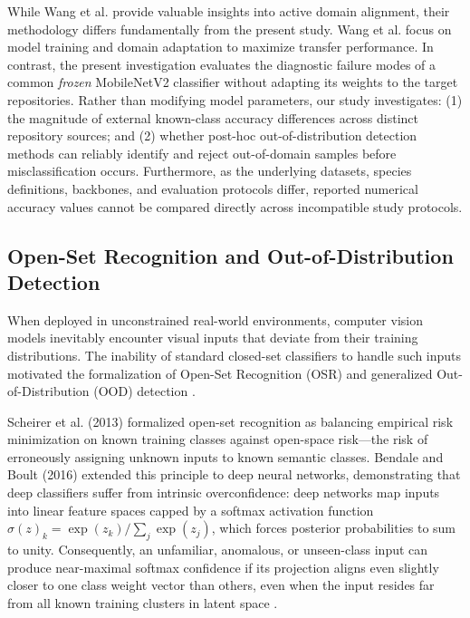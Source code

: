 While Wang et al. \cite{wang2023crossdomain} provide valuable insights into active domain alignment, their methodology differs fundamentally from the present study. Wang et al. focus on model training and domain adaptation to maximize transfer performance. In contrast, the present investigation evaluates the diagnostic failure modes of a common \textit{frozen} MobileNetV2 classifier without adapting its weights to the target repositories. Rather than modifying model parameters, our study investigates: (1) the magnitude of external known-class accuracy differences across distinct repository sources; and (2) whether post-hoc out-of-distribution detection methods can reliably identify and reject out-of-domain samples before misclassification occurs. Furthermore, as the underlying datasets, species definitions, backbones, and evaluation protocols differ, reported numerical accuracy values cannot be compared directly across incompatible study protocols.

\subsection{Open-Set Recognition and Out-of-Distribution Detection}
\label{sec:osr_ood_detection}

When deployed in unconstrained real-world environments, computer vision models inevitably encounter visual inputs that deviate from their training distributions. The inability of standard closed-set classifiers to handle such inputs motivated the formalization of Open-Set Recognition (OSR) and generalized Out-of-Distribution (OOD) detection \cite{scheirer2013toward,bendale2016towards,yang2024generalized}.

Scheirer et al. (2013) \cite{scheirer2013toward} formalized open-set recognition as balancing empirical risk minimization on known training classes against open-space risk---the risk of erroneously assigning unknown inputs to known semantic classes. Bendale and Boult (2016) \cite{bendale2016towards} extended this principle to deep neural networks, demonstrating that deep classifiers suffer from intrinsic overconfidence: deep networks map inputs into linear feature spaces capped by a softmax activation function $\sigma(z)_k = \exp(z_k) / \sum_j \exp(z_j)$, which forces posterior probabilities to sum to unity. Consequently, an unfamiliar, anomalous, or unseen-class input can produce near-maximal softmax confidence if its projection aligns even slightly closer to one class weight vector than others, even when the input resides far from all known training clusters in latent space \cite{guo2017calibration,hendrycks2017baseline,vaze2022open}.

